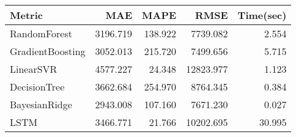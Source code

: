 \begin{tabular}{lrrrr}
\toprule
Metric &      MAE &    MAPE &      RMSE &  Time(sec) \\
\midrule
RandomForest     & 3196.719 & 138.922 &  7739.082 &      2.554 \\
GradientBoosting & 3052.013 & 215.720 &  7499.656 &      5.715 \\
LinearSVR        & 4577.227 &  24.348 & 12823.977 &      1.123 \\
DecisionTree     & 3662.684 & 254.970 &  8764.345 &      0.384 \\
BayesianRidge    & 2943.008 & 107.160 &  7671.230 &      0.027 \\
LSTM             & 3466.771 &  21.766 & 10202.695 &     30.995 \\
\bottomrule
\end{tabular}
